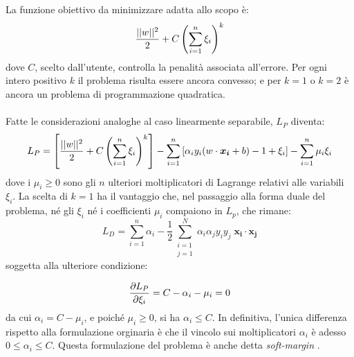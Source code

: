 La funzione obiettivo da minimizzare adatta allo scopo è:
\begin{equation}
	\frac{||w||^2}{2} + C \left( \sum\limits_{i = 1}^{n} {\xi_i} \right)^k
\vspace{2mm} 
\end{equation}
dove $C$, scelto dall'utente, controlla la penalità associata all'errore. %
Per ogni intero positivo $k$ il problema risulta essere ancora convesso; e per $k = 1$ o $k = 2$ è ancora un problema di programmazione quadratica.

\paragraph{}
Fatte le considerazioni analoghe al caso linearmente separabile, $L_P$ diventa:
\begin{equation}
 	L_P = \left[ \frac{||w||^2}{2} + C \left( \sum\limits_{i = 1}^{n}{\xi_i} \right)^k \right]  	
 	- \sum\limits_{i = 1}^{n} {\left[ \alpha_i y_i (w \cdot \boldsymbol{x_i} + b) - 1 + \xi_i \right]}  	
 	- \sum\limits_{i = 1}^{n} { \mu_i \xi_i } 		
\vspace{2mm}
\end{equation}
dove i $\mu_i \geq 0$ sono gli $n$ ulteriori moltiplicatori di Lagrange relativi alle variabili $\xi_i$.
La scelta di $k = 1$ ha il vantaggio che, nel passaggio alla forma duale del problema, né gli $\xi_i$ né i coefficienti $\mu_i$ compaiono in $L_p$, che rimane:
\begin{equation}
	L_D = \sum\limits_{i = 1}^{n} {\alpha_i} - \frac{1}{2} \sum\limits_{\substack{i = 1 \\ j = 1}}^{N} {\alpha_i \alpha_j y_i y_j \; \boldsymbol{x_i} \cdot \boldsymbol{x_j}}
\end{equation} 
soggetta alla ulteriore condizione:

\begin{equation}	
	\frac{\partial L_P}{\partial \xi_i} = C - \alpha_i - \mu_i = 0
	\vspace{2mm}
\end{equation}
da cui $\alpha_i = C - \mu_i$, e poiché $\mu_i \geq 0$, si ha $ \alpha_i \leq C$.
In definitiva, l'unica differenza rispetto alla formulazione orginaria è che il vincolo sui moltiplicatori $\alpha_i$ è adesso $0 \leq \alpha_i \leq C$. Questa formulazione del problema è anche detta \textit{soft-margin} \cite{cortes}.

